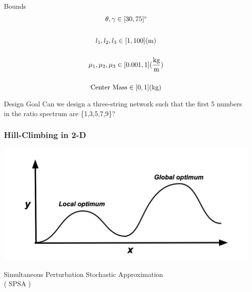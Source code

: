 \documentclass{beamer}
\begin{document}
\begin{frame}{Bounds}
    \centering
    \fontsize{24}{28}\selectfont
    \begin{gather*}
        \theta, \gamma \in [30, 75] \text{\textdegree}\\[0.6cm]
        l_1, l_2, l_3 \in [1, 100] \text{(m)} \\[0.5cm]
        \mu_1, \mu_2, \mu_3 \in [0.001, 1] (\frac{\text{kg}}{\text{m}})\\[0.5cm]
        \text{Center Mass} \in [0, 1] \text{(kg)}
    \end{gather*}
\end{frame}

\begin{frame}{Design Goal}
    \centering
    \Huge Can we design a three-string network such that the first 5 numbers in the ratio spectrum are \{1,3,5,7,9\}?
\end{frame}

\begin{frame}
\frametitle{Hill-Climbing in 2-D}
    \centering
    \includegraphics[width=\textwidth,height=.8\textheight,keepaspectratio]{Optimum.png}
\end{frame}

\begin{frame}
    \centering
    \Huge Simultaneous Perturbation Stochastic Approximation \\ ( SPSA )
\end{frame}
\end{document}
